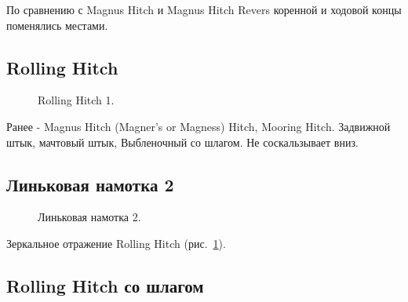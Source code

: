По сравнению с Magnus Hitch и Magnus Hitch Revers коренной и ходовой концы поменялись местами.

\subsection{Rolling Hitch}

\begin{figure}[H]\centering
\hfil
\hfil
	\caption{Rolling Hitch 1.}\label{ris:Rolling_Hitch}
\end{figure}

Ранее - Magnus Hitch (Magner’s or Magness) Hitch, Mooring Hitch. Задвижной штык, мачтовый штык, Выбленочный со шлагом. Не соскальзывает вниз.

\subsection{Линьковая намотка 2}

\begin{figure}[H]\centering
	\begin{minipage}{1\linewidth}
		\begin{center}
			\tcbox[enhanced jigsaw,colframe=black,opacityframe=0.5,opacityback=0.5]
			{\centering{}}
		\end{center}
	\end{minipage}
\caption{Линьковая намотка 2.}
\label{ris:Linkovaya_namotka_2}
\end{figure}

Зеркальное отражение Rolling Hitch (рис.~\ref{ris:Rolling_Hitch}).

\subsection{Rolling Hitch со шлагом}

